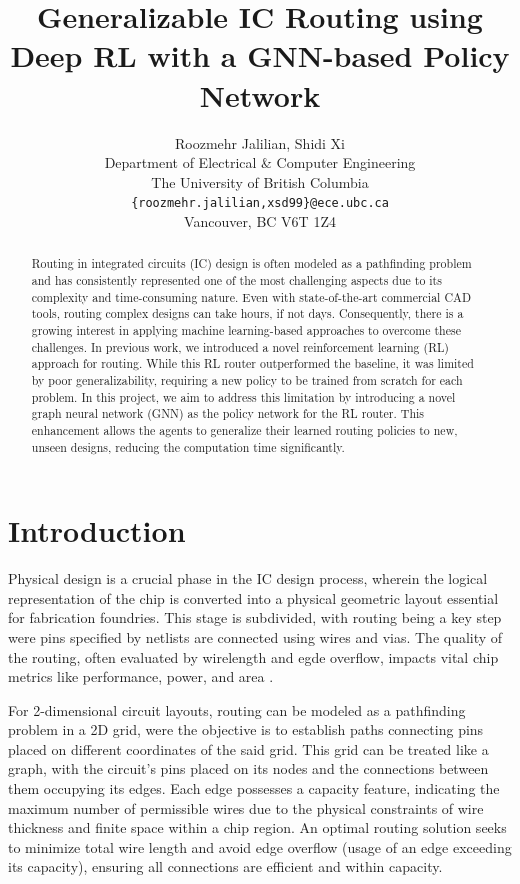 \documentclass[letterpaper]{article}
\title{Generalizable IC Routing using Deep RL with a GNN-based Policy Network}
\author{%
    Roozmehr Jalilian, Shidi Xi \\
    Department of Electrical \& Computer Engineering \\
    The University of British Columbia \\
    \texttt{\{roozmehr.jalilian,xsd99\}@ece.ubc.ca} \\
    Vancouver, BC V6T 1Z4
}
\begin{document}
\maketitle


\begin{abstract}
Routing in integrated circuits (IC) design is often modeled as a pathfinding problem and has consistently represented one of the most challenging aspects due to its complexity and time-consuming nature. Even with state-of-the-art commercial CAD tools, routing complex designs can take hours, if not days. Consequently, there is a growing interest in applying machine learning-based approaches to overcome these challenges. In previous work, we introduced a novel reinforcement learning (RL) approach for routing. While this RL router outperformed the baseline, it was limited by poor generalizability, requiring a new policy to be trained from scratch for each problem. In this project, we aim to address this limitation by introducing a novel graph neural network (GNN) as the policy network for the RL router. This enhancement allows the agents to generalize their learned routing policies to new, unseen designs, reducing the computation time significantly.
\end{abstract}

\section{Introduction}
Physical design is a crucial phase in the IC design process, wherein the logical representation of the chip is converted into a physical geometric layout essential for fabrication foundries. This stage is subdivided, with routing being a key step were pins specified by netlists are connected using wires and vias. The quality of the routing, often evaluated by wirelength and egde overflow, impacts vital chip metrics like performance, power, and area \cite{Hu2001}.

For 2-dimensional circuit layouts, routing can be modeled as a pathfinding problem in a 2D grid, were the objective is to establish paths connecting pins placed on different coordinates of the said grid. This grid can be treated like a graph, with the circuit's pins placed on its nodes and the connections between them occupying its edges. Each edge possesses a capacity feature, indicating the maximum number of permissible wires due to the physical constraints of wire thickness and finite space within a chip region. An optimal routing solution seeks to minimize total wire length and avoid edge overflow (usage of an edge exceeding its capacity), ensuring all connections are efficient and within capacity.
\end{document}
